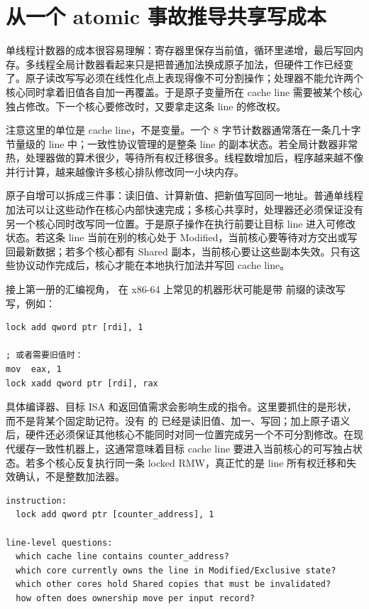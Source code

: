 \section{从一个 atomic 事故推导共享写成本}

单线程计数器的成本很容易理解：寄存器里保存当前值，循环里递增，最后写回内存。多线程全局计数器看起来只是把普通加法换成原子加法，但硬件工作已经变了。原子读改写写必须在线性化点上表现得像不可分割操作；处理器不能允许两个核心同时拿着旧值各自加一再覆盖。于是原子变量所在 cache line 需要被某个核心独占修改。下一个核心要修改时，又要拿走这条 line 的修改权。

注意这里的单位是 cache line，不是变量。一个 8 字节计数器通常落在一条几十字节量级的 line 中；一致性协议管理的是整条 line 的副本状态。若全局计数器非常热，处理器做的算术很少，等待所有权迁移很多。线程数增加后，程序越来越不像并行计算，越来越像许多核心排队修改同一小块内存。

原子自增可以拆成三件事：读旧值、计算新值、把新值写回同一地址。普通单线程加法可以让这些动作在核心内部快速完成；多核心共享时，处理器还必须保证没有另一个核心同时改写同一位置。于是原子操作在执行前要让目标 line 进入可修改状态。若这条 line 当前在别的核心处于 Modified，当前核心要等待对方交出或写回最新数据；若多个核心都有 Shared 副本，当前核心要让这些副本失效。只有这些协议动作完成后，核心才能在本地执行加法并写回 cache line。

接上第一册的汇编视角， 在 x86-64 上常见的机器形状可能是带  前缀的读改写写，例如：

\begin{lstlisting}[numbers=none,caption={原子加法可能出现的汇编形状}]
lock add qword ptr [rdi], 1

; 或者需要旧值时：
mov  eax, 1
lock xadd qword ptr [rdi], rax
\end{lstlisting}

具体编译器、目标 ISA 和返回值需求会影响生成的指令。这里要抓住的是形状，而不是背某个固定助记符。没有  的  已经是读旧值、加一、写回；加上原子语义后，硬件还必须保证其他核心不能同时对同一位置完成另一个不可分割修改。在现代缓存一致性机器上，这通常意味着目标 cache line 要进入当前核心的可写独占状态。若多个核心反复执行同一条 locked RMW，真正忙的是 line 所有权迁移和失效确认，不是整数加法器。

\begin{lstlisting}[numbers=none,caption={从 locked RMW 读出 cache line 账本}]
instruction:
  lock add qword ptr [counter_address], 1

line-level questions:
  which cache line contains counter_address?
  which core currently owns the line in Modified/Exclusive state?
  which other cores hold Shared copies that must be invalidated?
  how often does ownership move per input record?
\end{lstlisting}

